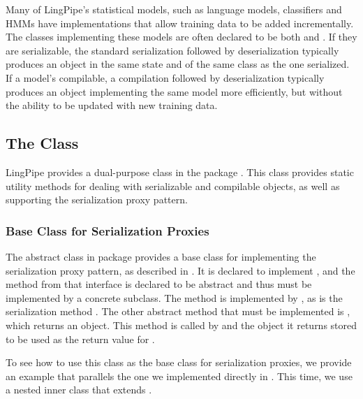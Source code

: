 Many of LingPipe's statistical models, such as language models,
classifiers and HMMs have implementations that allow training data to
be added incrementally.  The classes implementing these models are
often declared to be both  and .
If they are serializable, the standard serialization followed by
deserialization typically produces an object in the same state and
of the same class as the one serialized.  If a model's compilable,
a compilation followed by deserialization typically produces an
object implementing the same model more efficiently, but without the
ability to be updated with new training data. 


\subsection{The  Class}\label{section:io-abstract-externalizable}

LingPipe provides a dual-purpose class 
in the package .  This class provides static
utility methods for dealing with serializable and compilable objects,
as well as supporting the serialization proxy pattern.

\subsubsection{Base Class for Serialization Proxies}

The abstract class  in package
 provides a base class for implementing the
serialization proxy pattern, as described in
.  It is declared to implement
, and the 
method from that interface is declared to be abstract and thus must be
implemented by a concrete subclass.  The method
 is implemented by
, as is the serialization method
.  The other abstract method that must be
implemented is , which returns an object.
This method is called by  and the object it
returns stored to be used as the return value for
.

To see how to use this class as the base class for serialization
proxies, we provide an example that parallels the one we implemented
directly in .  This time, we use
a nested inner class that extends .

